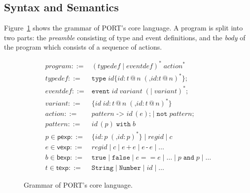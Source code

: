 \fi


\subsection{Syntax and Semantics}
\label{sub:SyntaxAndSemantics}

Figure~\ref{lst:SyntaxGrammar} shows the grammar of PORT's core language.
A program is split into two parts: the \emph{preamble} consisting of type and event definitions, and the \emph{body} of the program which consists of a sequence of actions.

\begin{figure}[t]
\centering
\begin{align*}
\mathit{program} ::= {} &  (\mathit{typedef} \mid \mathit{eventdef})^* \; \mathit{action}^*\\
\mathit{typedef} ::= {} & \mathtt{type}\; \mathit{id} \texttt{\{}\mathit{id} \texttt{:}\, t\, \texttt{@}\, n \; (\texttt{,} \mathit{id}\texttt{:} t\,\texttt{@}\,n)^*\texttt{\};}\\
\mathit{eventdef} ::= {} & \mathtt{event}\; \mathit{id} \; \mathit{variant} \; (\texttt{|}\; \mathit{variant})^*\texttt{;}\\
\mathit{variant} ::= {} & \texttt{\{}\mathit{id}\; \mathit{id}\texttt{:}\, t\,\texttt{@}\,n \; (\texttt{,} \mathit{id}\texttt{:}\, t\,\texttt{@}\,n)^*\texttt{\}}\\
\mathit{action} ::= {} & \mathit{pattern} \texttt{ -> } \mathit{id}\,(e) \texttt{;} \mid \mathtt{not} \; \mathit{pattern} \texttt{;}\\
\mathit{pattern} ::= {} & \mathit{id}\,(p) \;\mathtt{with}\; b\\
p \in \mathsf{pexp} ::= {} & \texttt{\{} \mathit{id}\texttt{:}\, p \; (\texttt{,} \mathit{id}\texttt{:}\, p)^*\texttt{\}} \mid \mathit{regid} \mid c \\
e \in \mathsf{vexp} ::= {} & \mathit{regid} \mid c \mid e \,\texttt{+}\, e \mid e \,\texttt{-}\, e \mid \dots\\
b \in \mathsf{bexp} ::= {} & \mathtt{true} \mid \mathtt{false} \mid e == e \mid \ldots \mid p \;\mathtt{and}\; p \mid \dots\\
t \in \mathsf{texp} ::= {} & \mathtt{String} \mid \mathtt{Number} \mid \mathit{id} \mid \dots
\end{align*}
\caption{Grammar of PORT's core language.}
\label{lst:SyntaxGrammar}
\end{figure}

